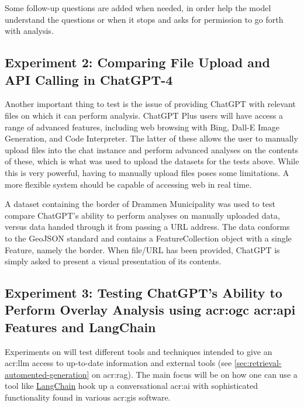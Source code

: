 Some follow-up questions are added when needed, in order help the model understand the questions or when it stops and asks for permission to go forth with analysis.

\subsection{Experiment 2: Comparing File Upload and API Calling in ChatGPT-4}

Another important thing to test is the issue of providing ChatGPT with relevant files on which it can perform analysis. ChatGPT Plus users will have access a range of advanced features, including web browsing with Bing, Dall-E Image Generation, and Code Interpreter. The latter of these allows the user to manually upload files into the chat instance and perform advanced analyses on the contents of these, which is what was used to upload the datasets for the tests above. While this is very powerful, having to manually upload files poses some limitations. A more flexible system should be capable of accessing web  in real time.

A dataset containing the border of Drammen Municipality was used to test compare ChatGPT's ability to perform analyses on manually uploaded data, versus data handed through it from passing a URL address. The data conforms to the GeoJSON standard and contains a FeatureCollection object with a single Feature, namely the border. When file/URL has been provided, ChatGPT is simply asked to present a visual presentation of its contents.

\subsection[Experiment 3: Testing ChatGPT's Ability to Perform Overlay Analysis using OGC API Features]{Experiment 3: Testing ChatGPT's Ability to Perform Overlay Analysis using \acrshort{acr:ogc} \acrshort{acr:api} Features and LangChain}


Experiments on  will test different tools and techniques intended to give an \acrshort{acr:llm} access to up-to-date information and external tools (see \autoref{sec:retrieval-automented-generation} on \acrlong{acr:rag}). The main focus will be on how one can use a tool like \hyperref[subsubsec:langchain]{LangChain} hook up a conversational \acrshort{acr:ai} with sophisticated functionality found in various \acrshort{acr:gis} software.

